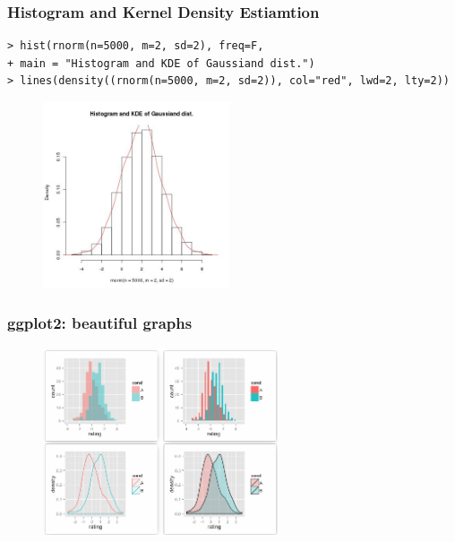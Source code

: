 \documentclass{beamer}
\begin{document}

\begin{frame}[fragile]
  
\frametitle{Histogram and Kernel Density Estiamtion}
 \begin{footnotesize}
   \begin{verbatim}
> hist(rnorm(n=5000, m=2, sd=2), freq=F, 
+ main = "Histogram and KDE of Gaussiand dist.")
> lines(density((rnorm(n=5000, m=2, sd=2)), col="red", lwd=2, lty=2))
   \end{verbatim}
 \end{footnotesize}
\vspace{-1cm}
\begin{figure}
\includegraphics[height=5.5cm]{figs/hist.jpeg}
\end{figure}

\end{frame}


\begin{frame}[fragile]
  
\frametitle{ggplot2: beautiful graphs}

\begin{figure}
\includegraphics[height=5.5cm]{figs/ggplot2-hist.png}
\end{figure}
\scriptsize{}

\end{frame}
\end{document}
